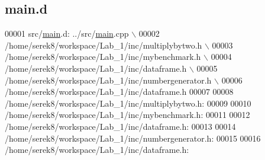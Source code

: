 \hypertarget{main_8d}{\subsection{main.\-d}
\label{main_8d}
}

\begin{DoxyCode}
00001 src/\hyperlink{main_8cpp_a0ddf1224851353fc92bfbff6f499fa97}{main}.d: ../src/\hyperlink{main_8cpp_a0ddf1224851353fc92bfbff6f499fa97}{main}.cpp \(\backslash\)
00002  /home/serek8/workspace/Lab\_1/inc/multiplybytwo.h \(\backslash\)
00003  /home/serek8/workspace/Lab\_1/inc/mybenchmark.h \(\backslash\)
00004  /home/serek8/workspace/Lab\_1/inc/dataframe.h \(\backslash\)
00005  /home/serek8/workspace/Lab\_1/inc/numbergenerator.h \(\backslash\)
00006  /home/serek8/workspace/Lab\_1/inc/dataframe.h
00007 
00008 /home/serek8/workspace/Lab\_1/inc/multiplybytwo.h:
00009 
00010 /home/serek8/workspace/Lab\_1/inc/mybenchmark.h:
00011 
00012 /home/serek8/workspace/Lab\_1/inc/dataframe.h:
00013 
00014 /home/serek8/workspace/Lab\_1/inc/numbergenerator.h:
00015 
00016 /home/serek8/workspace/Lab\_1/inc/dataframe.h:
\end{DoxyCode}
